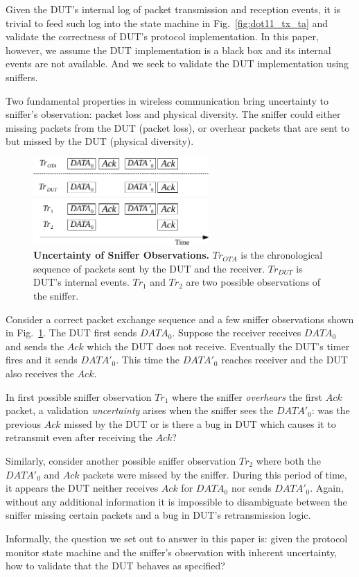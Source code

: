 Given the DUT's internal log of packet transmission and reception
events, it is trivial to feed such log into the state machine in
Fig.~\ref{fig:dot11_tx_ta} and validate the correctness of DUT's protocol
implementation. In this paper, however, we assume the DUT implementation is a
black box and its internal events are not available. And we seek to validate the
DUT implementation using sniffers.

Two fundamental properties in wireless communication bring uncertainty
to sniffer's observation: packet loss and physical diversity. The sniffer could
either missing packets from the DUT (packet loss), or overhear packets that are
sent to but missed by the DUT (physical diversity).

\begin{figure}[H]
  \vspace*{-3mm}
  \centering
  \includegraphics[width=0.6\textwidth]{./figures/false_pos.pdf}
  \caption{\textbf{Uncertainty of Sniffer Observations.} $Tr_{OTA}$ is
    the chronological sequence of packets sent by the DUT and the receiver.
    $Tr_{DUT}$ is DUT's internal events. $Tr_1$ and $Tr_2$ are two possible observations
  of the sniffer.}
  \label{fig:sniffer_in_middle}
  \vspace*{-5mm}
\end{figure}

Consider a correct packet exchange sequence and a few sniffer observations
shown in Fig.~\ref{fig:sniffer_in_middle}. The DUT first sends
$DATA_0$.  Suppose the receiver receives $DATA_0$ and sends the $Ack$ which the
DUT does not receive. Eventually the DUT's timer fires and it sends $DATA'_0$.
This time the $DATA'_0$ reaches receiver and the DUT also receives the $Ack$.

In first possible sniffer observation $Tr_1$ where the sniffer
\textit{overhears} the first $Ack$ packet, a validation \textit{uncertainty}
arises when the sniffer sees the $DATA'_0$: was the previous $Ack$ missed by the
DUT or is there a bug in DUT which causes it to retransmit even after receiving
the $Ack$?

Similarly, consider another possible sniffer observation $Tr_2$
where both the $DATA'_0$ and $Ack$ packets were missed by the sniffer.  During
this period of time, it appears the DUT neither receives $Ack$ for $DATA_0$ nor
sends $DATA'_0$.  Again, without any additional information it is impossible to
disambiguate between the sniffer missing certain packets and a bug in DUT's
retransmission logic.

Informally, the question we set out to answer in this paper is: given the
protocol monitor state machine and the sniffer's
observation with inherent uncertainty, how to validate that the DUT behaves as
specified?
